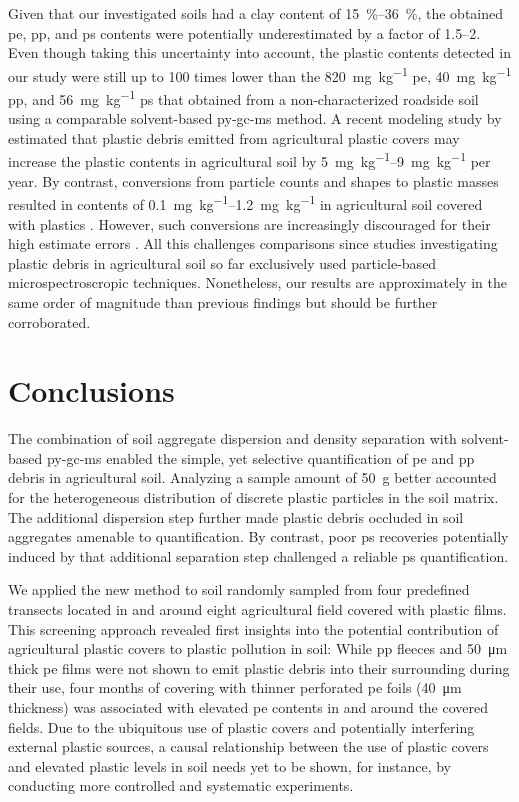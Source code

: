 Given that our investigated soils had a clay content of \SIrange{15}{36}{\percent}, the obtained \ac{pe}, \ac{pp}, and \ac{ps} contents were potentially
underestimated by a factor of \numrange{1.5}{2}. Even though taking this uncertainty into account, the plastic contents detected in our study were still up to \num{100} times lower than the \SI{820}{\milli\gram\per\kilo\gram} \ac{pe}, \SI{40}{\milli\gram\per\kilo\gram} \ac{pp}, and \SI{56}{\milli\gram\per\kilo\gram} \ac{ps} that \citet{DierkesQuantification2019} obtained from a non-characterized roadside soil using a comparable solvent-based \ac{py-gc-ms} method. A recent modeling study by \citet{BrandesIdentifying2021} estimated that plastic debris emitted from agricultural plastic covers may increase the plastic contents in agricultural soil by \SIrange{5}{9}{\milli\gram\per\kilo\gram} per year. By contrast, conversions from particle counts and shapes to plastic masses resulted in  contents of \SIrange{0.1}{1.2}{\milli\gram\per\kilo\gram} in agricultural soil covered with plastics \citep{BuksGlobal2020}. However, such conversions are increasingly discouraged for their high estimate errors \citep[Chapter~\ref{ch:analytical-techniques};][]{PrimpkeComparison2020}.
All this challenges comparisons since studies investigating plastic debris in agricultural soil so far exclusively used particle-based microspectroscropic techniques. Nonetheless, our results are approximately in the same order of magnitude than previous findings but should be further corroborated.

\section{Conclusions}

The combination of soil aggregate dispersion and density separation with solvent-based \ac{py-gc-ms} enabled the simple, yet selective quantification of \ac{pe} and \ac{pp} debris in agricultural soil. Analyzing a sample amount of \SI{50}{\gram} better accounted for the heterogeneous distribution of discrete plastic particles in the soil matrix. The additional dispersion step further made plastic debris occluded in soil aggregates amenable to quantification. By contrast, poor \ac{ps} recoveries potentially induced by that additional separation step challenged a reliable \ac{ps} quantification.

We applied the new method to soil randomly sampled from four predefined transects located in and around eight agricultural field covered with plastic films. This screening approach revealed first insights into the potential contribution of agricultural plastic covers to plastic pollution in soil: While \ac{pp} fleeces and \SI{50}{\micro\meter} thick \ac{pe} films were not shown to emit plastic debris into their surrounding during their use, four months of covering with thinner perforated \ac{pe} foils (\SI{40}{\micro\meter} thickness) was associated with elevated \ac{pe} contents in and around the covered fields. Due to the ubiquitous use of plastic covers and potentially interfering external plastic sources, a causal relationship between the use of plastic covers and elevated plastic levels in soil needs yet to be shown, for instance, by conducting more controlled and systematic experiments.

